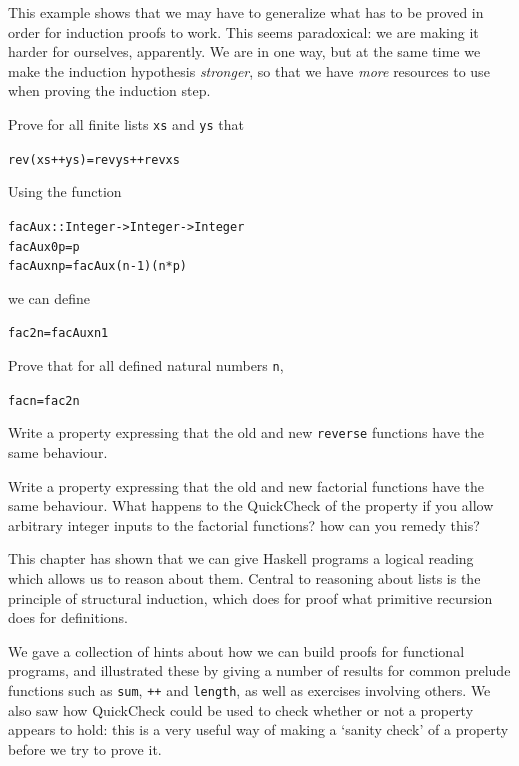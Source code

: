 \medskip
\noindent
This example shows that we may have to generalize what has to be proved in
order for induction proofs to work. This seems paradoxical: we are making it
harder for ourselves, apparently. We are in one way, but at the same time we
make the induction hypothesis {\em stronger}, so that we have {\em more\/}
resources to use when proving the induction step.


\begin{exercises}
\item
Prove for all finite lists \texttt{xs} and \texttt{ys} that
\begin{alltt}
rev (xs ++ ys) = rev ys ++ rev xs
\end{alltt}

\item
Using the function
\begin{alltt}
facAux :: Integer -> Integer -> Integer
facAux 0 p = p
facAux n p = facAux (n-1) (n*p)
\end{alltt}
we can define
\begin{alltt}
fac2 n = facAux n 1
\end{alltt}
Prove that for all defined natural numbers \texttt{n},
\begin{alltt}
fac n = fac2 n
\end{alltt}


\item
Write a property expressing that the old and new \texttt{reverse} functions have the same behaviour.

\item
Write a property expressing that the old and new factorial functions have the same behaviour. What happens to the QuickCheck of the property if you allow arbitrary integer inputs to the factorial functions? how can you remedy this?




\end{exercises}


\begin{summary}
This chapter has shown that we can give Haskell programs a logical reading
which allows us to reason about them. Central to reasoning
about lists is the principle of structural induction, which does
for proof what primitive recursion does for definitions.

We gave a collection of hints about how we can build
proofs for functional programs, and illustrated these by giving a number of results
for common prelude functions such as \texttt{sum}, \texttt{++} and
\texttt{length}, as well as exercises involving others. We also saw how QuickCheck could be used to check whether or not a property appears to hold: this is a very useful way of making a `sanity check' of a property before we try to prove it.



\end{summary}
%
